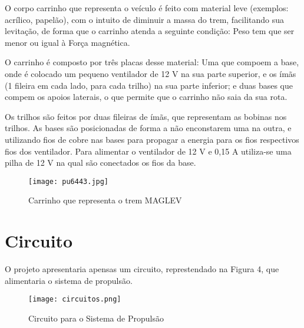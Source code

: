 \documentclass[
	12pt,				%
	openany,			%
	a4paper,			%
	english,			%
	spanish,			%
	brazil,				%
	]{abntex2}
\begin{document}
O corpo carrinho que representa o veículo é feito com material leve (exemplos: acrílico, papelão), com o intuito de diminuir a massa do trem, facilitando sua levitação, de forma que o carrinho atenda a seguinte condição: Peso tem que ser menor ou igual à Força magnética.

O carrinho é composto por três placas desse material: Uma que compoem a base, onde é colocado um pequeno ventilador de 12 V na sua parte superior, e os ímãs (1 fileira em cada lado, para cada trilho) na sua parte inferior; e duas bases que compem os apoios laterais, o que permite que o carrinho não saia da sua rota.

Os trilhos são feitos por duas fileiras de ímãs, que representam as bobinas nos trilhos. As bases são posicionadas de forma a não enconstarem uma na outra, e utilizando fios de cobre nas bases para propagar a energia para os fios respectivos fios dos ventilador. Para alimentar o ventilador de 12 V e 0,15 A utiliza-se uma pilha de 12 V na qual são conectados os fios da base.

\begin{figure}
\centering
\texttt{[image: pu6443.jpg]}
\caption{Carrinho que representa o trem MAGLEV}
\label{Rotulo}
\end{figure}




%
\chapter{Circuito}
O projeto apresentaria apensas um circuito, represtendado na Figura 4, que alimentaria o sistema de propulsão. 

\begin{figure}
\centering
\texttt{[image: circuitos.png]}
\caption{Circuito para o Sistema de Propulsão}
\label{Rotulo}
\end{figure}





\postextual
\end{document}
